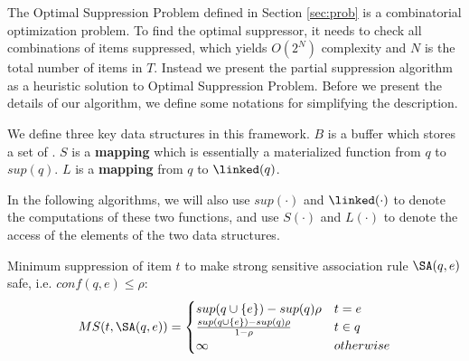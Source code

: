 
The Optimal Suppression Problem defined in Section \ref{sec:prob} is
a combinatorial optimization problem. To find the optimal suppressor, it needs
to check all combinations of items suppressed, which yields $O(2^N)$
complexity and $N$ is the total number of items in $T$. Instead we present
the partial suppression algorithm as a heuristic solution to Optimal
Suppression Problem.
Before we present the details of our algorithm, we define some notations for
simplifying the description.
\begin{definition}
We define three key data structures in this framework. $B$ is a \qid buffer
which stores a set of \qids. $S$ is a \textbf{mapping} which is essentially a
materialized function from \qid $q$ to $sup(q)$. $L$ is a \textbf{mapping}
from \qid $q$ to $\linked(q)$.
\end{definition}
In the following algorithms, we will also use $sup(\cdot)$ and
$\linked(\cdot)$ to denote the computations of these two functions, and use
$S(\cdot)$ and $L(\cdot)$ to denote the access of the elements of the two
data structures.
\begin{definition}
\label{minimum}
Minimum suppression of item $t$ to make strong sensitive association rule
$\SA(q,e)$ safe, i.e. $conf(q,e)\leq\rho$:
 \hspace{4mm}
\[MS(t,\SA(q,e))=
\begin{cases}
sup(q\cup \{e\})-sup(q)\rho & t=e  \\
\frac{sup(q\cup \{e\})-sup(q)\rho}{1-\rho} & t\in q \\
 \infty & otherwise
\end{cases} \]
\end{definition}
